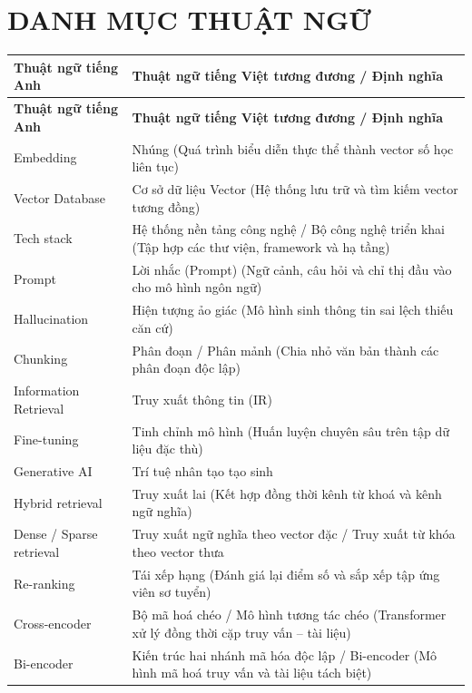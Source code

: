 \chapter*{DANH MỤC THUẬT NGỮ}

\begin{longtable}{|l|p{9.5cm}|}
    \hline
    \textbf{Thuật ngữ tiếng Anh} & \textbf{Thuật ngữ tiếng Việt tương đương / Định nghĩa} \\
    \hline
    \endfirsthead
    \hline
    \textbf{Thuật ngữ tiếng Anh} & \textbf{Thuật ngữ tiếng Việt tương đương / Định nghĩa} \\
    \hline
    \endhead
    \hline
    \endfoot
    Embedding & Nhúng (Quá trình biểu diễn thực thể thành vector số học liên tục) \\
    \hline
    Vector Database & Cơ sở dữ liệu Vector (Hệ thống lưu trữ và tìm kiếm vector tương đồng) \\
    \hline
    Tech stack & Hệ thống nền tảng công nghệ / Bộ công nghệ triển khai (Tập hợp các thư viện, framework và hạ tầng) \\
    \hline
    Prompt & Lời nhắc (Prompt) (Ngữ cảnh, câu hỏi và chỉ thị đầu vào cho mô hình ngôn ngữ) \\
    \hline
    Hallucination & Hiện tượng ảo giác (Mô hình sinh thông tin sai lệch thiếu căn cứ) \\
    \hline
    Chunking & Phân đoạn / Phân mảnh (Chia nhỏ văn bản thành các phân đoạn độc lập) \\
    \hline
    Information Retrieval & Truy xuất thông tin (IR) \\
    \hline
    Fine-tuning & Tinh chỉnh mô hình (Huấn luyện chuyên sâu trên tập dữ liệu đặc thù) \\
    \hline
    Generative AI & Trí tuệ nhân tạo tạo sinh \\
    \hline
    Hybrid retrieval & Truy xuất lai (Kết hợp đồng thời kênh từ khoá và kênh ngữ nghĩa) \\
    \hline
    Dense / Sparse retrieval & Truy xuất ngữ nghĩa theo vector đặc / Truy xuất từ khóa theo vector thưa \\
    \hline
    Re-ranking & Tái xếp hạng (Đánh giá lại điểm số và sắp xếp tập ứng viên sơ tuyển) \\
    \hline
    Cross-encoder & Bộ mã hoá chéo / Mô hình tương tác chéo (Transformer xử lý đồng thời cặp truy vấn -- tài liệu) \\
    \hline
    Bi-encoder & Kiến trúc hai nhánh mã hóa độc lập / Bi-encoder (Mô hình mã hoá truy vấn và tài liệu tách biệt) \\

\end{longtable}
